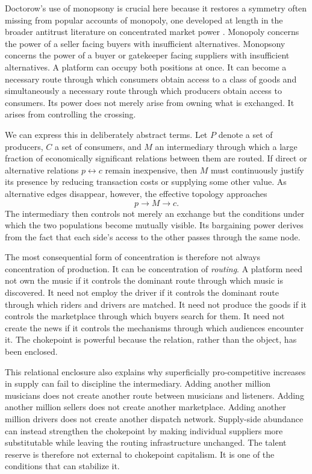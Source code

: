 \documentclass[11pt]{article}
\begin{document}
Doctorow's use of monopsony \parencite{doctorowgiblin2022chokepoint,azarmarinescu2022monopsony} is crucial here because it restores a symmetry often missing from popular accounts of monopoly, one developed at length in the broader antitrust literature on concentrated market power \parencite{wu2018curse,stoller2019goliath,posner2018radicalmarkets}. Monopoly concerns the power of a seller facing buyers with insufficient alternatives. Monopsony concerns the power of a buyer or gatekeeper facing suppliers with insufficient alternatives. A platform can occupy both positions at once. It can become a necessary route through which consumers obtain access to a class of goods and simultaneously a necessary route through which producers obtain access to consumers. Its power does not merely arise from owning what is exchanged. It arises from controlling the crossing.

We can express this in deliberately abstract terms. Let \(P\) denote a set of producers, \(C\) a set of consumers, and \(M\) an intermediary through which a large fraction of economically significant relations between them are routed. If direct or alternative relations \(p\leftrightarrow c\) remain inexpensive, then \(M\) must continuously justify its presence by reducing transaction costs or supplying some other value. As alternative edges disappear, however, the effective topology approaches
\[
p \longrightarrow M \longrightarrow c.
\]
The intermediary then controls not merely an exchange but the conditions under which the two populations become mutually visible. Its bargaining power derives from the fact that each side's access to the other passes through the same node.

The most consequential form of concentration is therefore not always concentration of production. It can be concentration of \emph{routing}. A platform need not own the music if it controls the dominant route through which music is discovered. It need not employ the driver if it controls the dominant route through which riders and drivers are matched. It need not produce the goods if it controls the marketplace through which buyers search for them. It need not create the news if it controls the mechanisms through which audiences encounter it. The chokepoint is powerful because the relation, rather than the object, has been enclosed.

This relational enclosure also explains why superficially pro-competitive increases in supply can fail to discipline the intermediary. Adding another million musicians does not create another route between musicians and listeners. Adding another million sellers does not create another marketplace. Adding another million drivers does not create another dispatch network. Supply-side abundance can instead strengthen the chokepoint by making individual suppliers more substitutable while leaving the routing infrastructure unchanged. The talent reserve is therefore not external to chokepoint capitalism. It is one of the conditions that can stabilize it.
\end{document}
